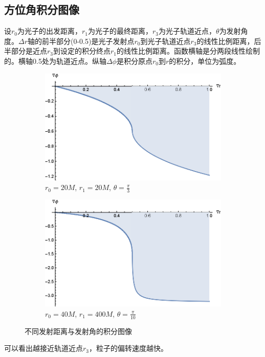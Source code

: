 \subsection{方位角积分图像}
设$r_0$为光子的出发距离，$r_1$为光子的最终距离，$r_3$为光子轨道近点，$\theta$为发射角度。$\Delta r$轴的前半部分(0-0.5)是光子发射点$r_0$到光子轨道近点$r_3$的线性比例距离，后半部分是近点$r_3$到设定的积分终点$r_1$的线性比例距离。函数横轴是分两段线性绘制的。横轴0.5处为轨道近点。纵轴$\Delta\phi$是积分原点$r_0$到$r$的积分，单位为弧度。
\begin{figure}[H]
    \centering
    \begin{subfigure}{.5\textwidth}
        \centering
        \includegraphics[width=.8\linewidth]{images/dphi_1.eps}
        \caption{$r_0=20M$, $r_1=20M$, $\theta=\frac{\pi}{3}$}\label{dphi_1} %
    \end{subfigure}%
    \begin{subfigure}{.5\textwidth}
        \centering
        \includegraphics[width=.8\linewidth]{images/dphi_2.eps}
        \caption{$r_0=40M$, $r_1=400M$, $\theta=\frac{\pi}{10}$}\label{dphi_2} %
    \end{subfigure}
    \caption{不同发射距离与发射角的积分图像}
\end{figure}
可以看出越接近轨道近点$r_3$，粒子的偏转速度越快。

